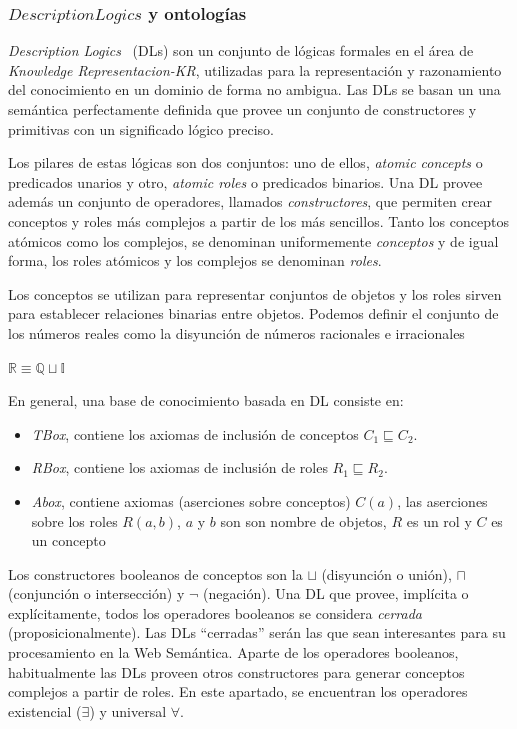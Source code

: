 \subsubsection{$Description Logics$ y ontologías}
\textit{Description Logics}~\cite{baader03description} (\gls{DL}s) son un conjunto de lógicas
formales en el área de
\textit{Knowledge Representacion-KR}, utilizadas para la representación y
razonamiento del conocimiento en un dominio de forma no ambigua. Las DLs se
basan un una semántica perfectamente definida que provee un conjunto de
constructores y primitivas con un significado lógico preciso.

Los pilares de estas lógicas son dos conjuntos: uno de ellos, \textit{atomic concepts}
o predicados unarios y otro, \textit{atomic roles} o predicados binarios. Una
DL provee además un conjunto de operadores, llamados \textit{constructores}, que
permiten crear conceptos y roles más complejos a partir de los más sencillos.
Tanto los conceptos atómicos como los complejos, se denominan uniformemente \textit{conceptos}
y de igual forma, los roles atómicos y los complejos se denominan
\textit{roles}.

Los conceptos se utilizan para representar conjuntos de objetos y los roles
sirven para establecer relaciones binarias entre objetos. Podemos definir el
conjunto de los números reales como la disyunción de
números racionales e irracionales
\begin{example}
$ \mathbb{R} \equiv \mathbb{Q} \sqcup \mathbb{I}$
\end{example}

En general, una base de conocimiento basada en DL consiste en:
\begin{itemize}
  \item \textit{TBox}, contiene los axiomas de inclusión de conceptos
  $C_1 \sqsubseteq C_2$.
  \item \textit{RBox}, contiene los axiomas de inclusión de roles $R_1 
  \sqsubseteq R_2$.
  \item \textit{Abox}, contiene axiomas (aserciones sobre conceptos) $C(a)$, las
  aserciones sobre los roles $R(a,b)$, $a$ y $b$ son son nombre de objetos, $R$
  es un rol y $C$ es un concepto
\end{itemize}
 
Los constructores booleanos de conceptos son la $\sqcup$ (disyunción o unión),
$\sqcap$ (conjunción o intersección) y $\neg$ (negación). Una
DL que provee, implícita o explícitamente, todos los operadores booleanos se
considera \textit{cerrada} (proposicionalmente). Las DLs ``cerradas'' serán las
que sean interesantes para su procesamiento en la Web Semántica. Aparte de los
operadores booleanos, habitualmente las DLs proveen otros constructores para
generar conceptos complejos a partir de roles. En este apartado, se encuentran
los operadores existencial ($\exists$)  y universal $\forall$. 

